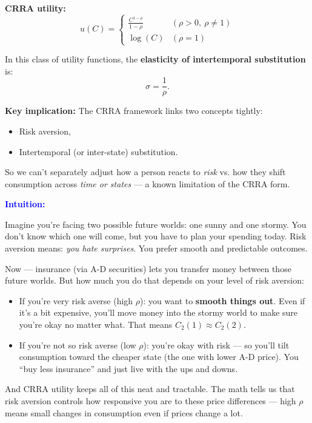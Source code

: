 \documentclass[12pt]{article}
\begin{document}
\bigskip

\textbf{CRRA utility:}
\[
u(C) =
\begin{cases}
\frac{C^{1 - \rho}}{1 - \rho} & (\rho > 0,\ \rho \neq 1) \\
\log(C) & (\rho = 1)
\end{cases}
\]

In this class of utility functions, the \textbf{elasticity of intertemporal substitution} is:
\[
\sigma = \frac{1}{\rho}.
\]

\textbf{Key implication:} The CRRA framework links two concepts tightly:
\begin{itemize}
    \item Risk aversion,
    \item Intertemporal (or inter-state) substitution.
\end{itemize}

So we can't separately adjust how a person reacts to \textit{risk} vs. how they shift consumption across \textit{time or states} — a known limitation of the CRRA form.

\bigskip

\textcolor{blue}{\textbf{Intuition:}}

Imagine you're facing two possible future worlds: one sunny and one stormy. You don’t know which one will come, but you have to plan your spending today. Risk aversion means: \textit{you hate surprises}. You prefer smooth and predictable outcomes. 

Now — insurance (via A-D securities) lets you transfer money between those future worlds. But how much you do that depends on your level of risk aversion:

\begin{itemize}
    \item If you’re very risk averse (high $\rho$): you want to \textbf{smooth things out}. Even if it's a bit expensive, you’ll move money into the stormy world to make sure you're okay no matter what. That means $C_2(1) \approx C_2(2)$.
    
    \item If you're not so risk averse (low $\rho$): you’re okay with risk — so you’ll tilt consumption toward the cheaper state (the one with lower A-D price). You “buy less insurance” and just live with the ups and downs.
\end{itemize}

And CRRA utility keeps all of this neat and tractable. The math tells us that risk aversion controls how responsive you are to these price differences — high $\rho$ means small changes in consumption even if prices change a lot.
\end{document}
